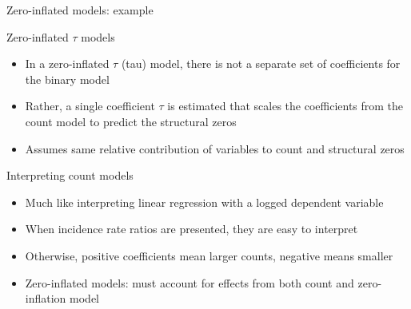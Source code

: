 \begin{frame}{Zero-inflated models: example}
  \\
  \tiny\citenhts
\end{frame}

\begin{frame}{Zero-inflated $\tau$ models}
  \begin{itemize}
    \item In a zero-inflated $\tau$ (tau) model, there is not a separate set of coefficients for the binary model
    \item Rather, a single coefficient $\tau$ is estimated that scales the coefficients from the count model to predict the structural zeros
    \item Assumes same relative contribution of variables to count and structural zeros
  \end{itemize}
\end{frame}

\begin{frame}{Interpreting count models}
  \begin{itemize}
    \item Much like interpreting linear regression with a logged dependent variable
    \item When incidence rate ratios are presented, they are easy to interpret
    \item Otherwise, positive coefficients mean larger counts, negative means smaller
    \item Zero-inflated models: must account for effects from both count and zero-inflation model
  \end{itemize}
\end{frame}

